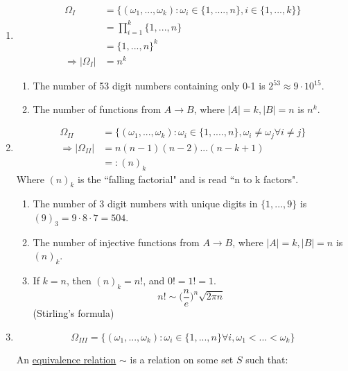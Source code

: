 \documentclass{article}
\begin{document}
	\begin{enumerate}[label=(\Roman*)]
		\item
		\begin{align*}
			\Omega_I&=\{(\omega_1, ..., \omega_k) : \omega_i\in\{1, ...., n\}, i\in\{1, ..., k\}\}\\
			&=\prod_{i=1}^k\{1, ..., n\}\\
			&=\{1, ..., n\}^k\\
			\Rightarrow|\Omega_I|&=n^k
		\end{align*}
		\begin{myex*}{}{}
			\begin{enumerate}
				\item The number of 53 digit numbers containing only 0-1 is $2^{53}\approx9\cdot10^{15}$.
				\item The number of functions from $A\to B$, where $|A|=k, |B|=n$ is $n^k$.
			\end{enumerate}
		\end{myex*}
		\item
		\begin{align*}
			\Omega_{II}&=\{(\omega_1, ..., \omega_k) : \omega_i\in\{1, ...., n\}, \omega_i\neq\omega_j\forall i\neq j\}\\
			\Rightarrow|\Omega_{II}|&=n(n-1)(n-2)...(n-k+1)\\
			&=:(n)_k
		\end{align*}
		Where $(n)_k$ is the ``falling factorial" and is read ``n to k factors".
		\begin{myex*}{}{}
			\begin{enumerate}
				\item The number of 3 digit numbers with unique digits in $\{1, ..., 9\}$ is $(9)_3=9\cdot8\cdot7=504$.
				\item The number of injective functions from $A\to B$, where $|A|=k, |B|=n$ is $(n)_k$.
				\item If $k=n$, then $(n)_k=n!$, and $0!=1!=1$.\\
				$$n!\sim\big(\frac{n}{e}\big)^n\sqrt{2\pi n}$$ (Stirling's formula)
			\end{enumerate}
		\end{myex*}
		\item
		\begin{equation*}
			\Omega_{III}=\{(\omega_1, ..., \omega_k) : \omega_i\in\{1, ..., n\}\forall i, \omega_1<...<\omega_k\}
		\end{equation*}
		\begin{mydef*}{}{}
			An \underline{equivalence relation} $\sim$ is a relation on some set $S$ such that:

\end{mydef*}
\end{enumerate}
\end{document}
